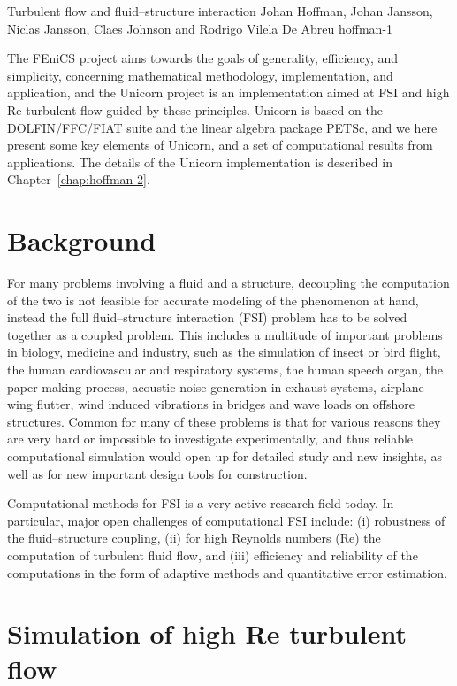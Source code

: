               {Turbulent flow and fluid--structure interaction}
              {Johan Hoffman, Johan Jansson, Niclas Jansson, Claes Johnson and Rodrigo Vilela De Abreu}
              {hoffman-1}

The FEniCS project aims towards the goals of generality, efficiency,
and simplicity, concerning mathematical methodology, implementation, and
application, and the Unicorn project is an implementation aimed at FSI
and high Re turbulent flow guided by these principles. Unicorn is based
on the DOLFIN/FFC/FIAT suite and the linear algebra package PETSc, and
we here present some key elements of Unicorn, and a set of computational
results from applications. The details of the Unicorn implementation is
described in Chapter~\ref{chap:hoffman-2}.

\section{Background}

For many problems involving a fluid and a structure, decoupling the
computation of the two is not feasible for accurate modeling of the
phenomenon at hand, instead the full fluid--structure interaction (FSI)
problem has to be solved together as a coupled problem. This includes a
multitude of important problems in biology, medicine and industry, such
as the simulation of insect or bird flight, the human cardiovascular
and respiratory systems, the human speech organ, the paper making
process, acoustic noise generation in exhaust systems, airplane wing
flutter, wind induced vibrations in bridges and wave loads on offshore
structures. Common for many of these problems is that for various reasons
they are very hard or impossible to investigate experimentally, and thus
reliable computational simulation would open up for detailed study and
new insights, as well as for new important design tools for construction.

Computational methods for FSI is a very active research field today. In
particular, major open challenges of computational FSI include: (i)
robustness of the fluid--structure coupling, (ii) for high Reynolds
numbers (Re) the computation of turbulent fluid flow, and (iii) efficiency
and reliability of the computations in the form of adaptive methods and
quantitative error estimation.

\section{Simulation of high Re turbulent flow}

